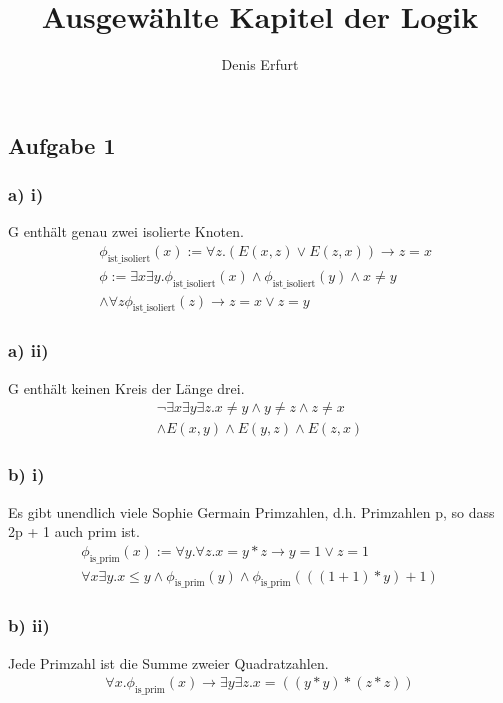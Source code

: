 \documentclass[12pt]{article}
\begin{document}
\title{Ausgewählte Kapitel der Logik}
\author{Denis Erfurt}
\maketitle





\subsection*{Aufgabe 1}
\subsubsection*{a) i)}
G enthält genau zwei isolierte Knoten.
\begin{eqnarray}
  &\phi_{\text{ist\_isoliert}}(x) := \forall z. (E(x,z)\lor E(z,x)) \rightarrow z = x \\
  &\phi := \exists x\exists y. \phi_{\text{ist\_isoliert}}(x) \land \phi_{\text{ist\_isoliert}}(y) \land x\neq y \\
  &\land \forall z \phi_{\text{ist\_isoliert}}(z) \rightarrow z = x \lor z = y
\end{eqnarray}
\subsubsection*{a) ii)}
G enthält keinen Kreis der Länge drei.
\begin{eqnarray}
  \neg \exists x \exists y \exists z. x \neq y \land y \neq z \land z \neq x \\
  \land E(x,y) \land E(y,z) \land E(z,x)
\end{eqnarray}
\subsubsection*{b) i)}
Es gibt unendlich viele Sophie Germain Primzahlen, d.h. Primzahlen p, so dass
2p + 1 auch prim ist.
\begin{eqnarray}
  \phi_{\text{is\_prim}}(x) := \forall y. \forall z. x=y*z \rightarrow y = 1 \lor z = 1\\
  \forall x \exists y . x \leq y \land \phi_{\text{is\_prim}}(y) \land \phi_{\text{is\_prim}}(((1+1)*y)+1)
\end{eqnarray}
\subsubsection*{b) ii)}
Jede Primzahl ist die Summe zweier Quadratzahlen.
\begin{eqnarray}
  \forall x. \phi_{\text{is\_prim}}(x) \rightarrow \exists y \exists z. x = ((y*y)*(z*z))
\end{eqnarray}
\end{document}
